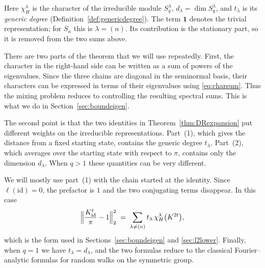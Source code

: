 \documentclass[11pt]{article}
\theoremstyle{plain}  %
\begin{document}
Here $\chi^{\lambda}_{H}$ is the character of the irreducible module
$S^{\lambda}_q$, $d_\lambda=\dim S^{\lambda}_q$, and $t_\lambda$ is its
\emph{generic degree} (Definition~\ref{def:genericdegree}). The term
$\mathbf{1}$ denotes the trivial representation; for $S_n$ this is
$\lambda=(n)$. Its contribution is the stationary part, so it is removed from
the two sums above.

There are two parts of the theorem that we will use repeatedly. First, the
character in the right-hand side can be written as a sum of powers of the
eigenvalues. Since the three chains are diagonal in the seminormal basis, their characters
can be expressed in terms of their eigenvalues using \eqref{eq:charsum}.
Thus the mixing problem reduces to controlling the resulting spectral sums. This is what we do in Section~\ref{sec:boundeigen}.


The second point is that the two identities in
Theorem~\ref{thm:DRexpansion} put different weights on the irreducible
representations. Part~(1), which gives the distance from a fixed starting
state, contains the generic degree $t_\lambda$. Part~(2), which averages over
the starting state with respect to $\pi$, contains only the dimension
$d_\lambda$. When $q>1$ these quantities can be very different. 



We will mostly use part~(1) with the chain started at the identity. Since
$\ell(\mathrm{id})=0$, the prefactor is $1$ and the two conjugating terms
disappear. In this case
$$
  \Bigl\|\frac{K^{t}_{\mathrm{id}}}{\pi}-1\Bigr\|_{2}^{2}
  \;=\; \sum_{\lambda \ne (n)}
  t_\lambda\,\chi^{\lambda}_{H}\bigl(K^{2t}\bigr),
$$
which is the form used in Sections~\ref{sec:boundeigen} and
\ref{sec:l2lower}. Finally, when $q=1$ we have $t_\lambda=d_\lambda$, and the
two formulas reduce to the classical Fourier--analytic formulas for random
walks on the symmetric group.
\end{document}
